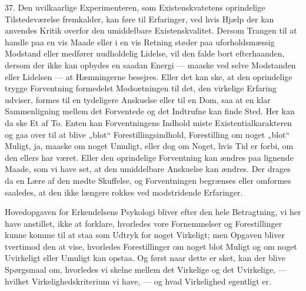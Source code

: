 \documentclass[12pt,a4paper]{book}
\newcommand{\apage}[1]{\marginnote{\footnotesize\textit{[#1]}}}
\begin{document}
37. Den uvilkaarlige Experimenteren, som Existenskvatetens oprindelige
Tilstedeværelse fremkalder, kan føre til Erfaringer, ved hvis Hjælp der
kan anvendes Kritik overfor den umiddelbare Existenskvalitet. Dersom
Trangen til at handle paa en vis Maade eller i en vis Retning støder paa
uforholdsmæssig Modstand eller medfører uudholdelig Lidelse, vil den
falde bort efterhaanden, dersom der ikke kan opbydes en saadan Energi
--- maaske ved selve Modstanden eller Lidelsen --- at Hæmningerne
besejres. Eller det kan ske, at den oprindelige trygge Forventning
formedelst Modsætningen til det, den virkelige Erfaring udviser, formes
til en tydeligere Anskuelse eller til en Dom, saa at en klar
Sammenligning mellem det Forventede og det Indtrufne \apage{103} kan finde Sted. Her
kan da ske Et af To. Enten kan Forventningens Indhold miste
Existentialkarakteren og gaa over til at blive „blot“ Forestillingsindhold,
Forestilling om noget „blot“ Muligt, ja, maaske om noget Umuligt, eller
dog om Noget, hvis Tid er forbi, om den ellers har været. Eller den
oprindelige Forventning kan ændres paa lignende Maade, som vi have set,
at den umiddelbare Anskuelse kan ændres. Der drages da en Lære af den
mødte Skuffelse, og Forventningen begrænses eller omformes saaledes, at
den ikke længere rokkes ved modstridende Erfaringer.

Hovedopgaven for Erkendelsens Psykologi bliver efter den hele
Betragtning, vi her have anstillet, ikke at forklare, hvorledes vore
Fornemmelser og Forestillinger kunne komme til at staa som Udtryk for
noget Virkeligt; men Opgaven bliver tvertimod den at vise, hvorledes
Forestillinger om noget blot Muligt og om noget Uvirkeligt eller Umuligt
kan opstaa. Og først naar dette er sket, kan der blive Spørgsmaal om,
hvorledes vi skelne mellem det Virkelige og det Uvirkelige, --- hvilket
Virkelighedskriterium vi have, --- og hvad Virkelighed egentligt er.
\end{document}
